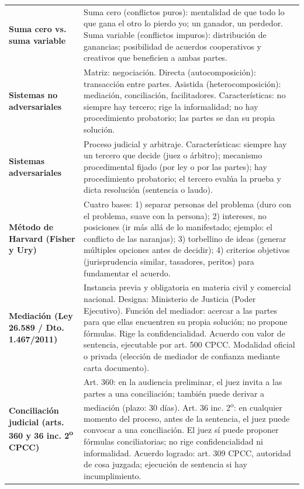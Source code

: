 \documentclass[12pt,oneside]{book}
\begin{document}
\begin{longtable}{@{}>{\raggedright\arraybackslash}p{} >{\raggedright\arraybackslash}X@{}}
\textbf{Suma cero vs. suma variable} &
Suma cero (conflictos puros): mentalidad de que todo lo que gana el otro lo pierdo yo; un ganador, un perdedor. Suma variable (conflictos impuros): distribución de ganancias; posibilidad de acuerdos cooperativos y creativos que beneficien a ambas partes. \\

\textbf{Sistemas no adversariales} &
Matriz: negociación. Directa (autocomposición): transacción entre partes. Asistida (heterocomposición): mediación, conciliación, facilitadores. Características: no siempre hay tercero; rige la informalidad; no hay procedimiento probatorio; las partes se dan su propia solución. \\

\textbf{Sistemas adversariales} &
Proceso judicial y arbitraje. Características: siempre hay un tercero que decide (juez o árbitro); mecanismo procedimental fijado (por ley o por las partes); hay procedimiento probatorio; el tercero evalúa la prueba y dicta resolución (sentencia o laudo). \\

\textbf{Método de Harvard (Fisher y Ury)} &
Cuatro bases: 1) separar personas del problema (duro con el problema, suave con la persona); 2) intereses, no posiciones (ir más allá de lo manifestado; ejemplo: el conflicto de las naranjas); 3) torbellino de ideas (generar múltiples opciones antes de decidir); 4) criterios objetivos (jurisprudencia similar, tasadores, peritos) para fundamentar el acuerdo. \\

\textbf{Mediación (Ley 26.589 / Dto. 1.467/2011)} &
Instancia previa y obligatoria en materia civil y comercial nacional. Designa: Ministerio de Justicia (Poder Ejecutivo). Función del mediador: acercar a las partes para que ellas encuentren su propia solución; no propone fórmulas. Rige la confidencialidad. Acuerdo con valor de sentencia, ejecutable por art. 500 CPCC. Modalidad oficial o privada (elección de mediador de confianza mediante carta documento). \\

\textbf{Conciliación judicial (arts. 360 y 36 inc. 2\textsuperscript{o} CPCC)} &
Art. 360: en la audiencia preliminar, el juez invita a las partes a una conciliación; también puede derivar a mediación (plazo: 30 días). Art. 36 inc. 2\textsuperscript{o}: en cualquier momento del proceso, antes de la sentencia, el juez puede convocar a una conciliación. El juez sí puede proponer fórmulas conciliatorias; no rige confidencialidad ni informalidad. Acuerdo logrado: art. 309 CPCC, autoridad de cosa juzgada; ejecución de sentencia si hay incumplimiento. \\


\end{longtable}
\end{document}
